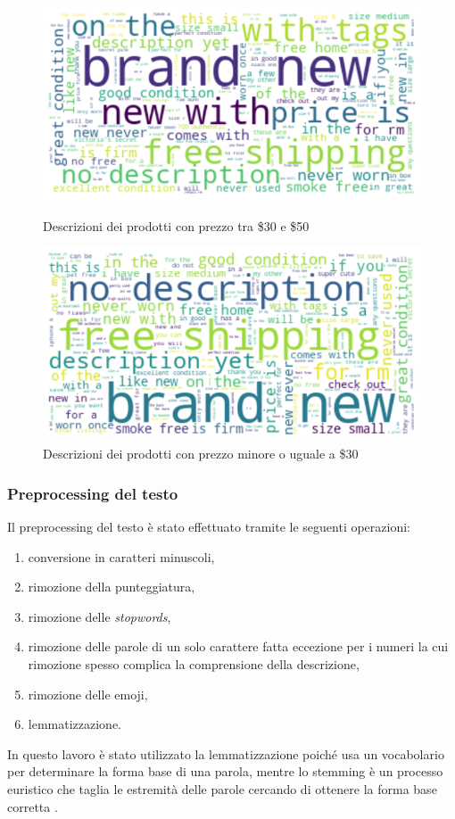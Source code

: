 \begin{figure}[H]
   \begin{minipage}{0.48\textwidth}
     \centering
     \includegraphics[width=.9\linewidth]{30_50}
	\caption{Descrizioni dei prodotti con prezzo tra \$30 e \$50}
	\label{fig:30_50}   
	\end{minipage}\hfill
   \begin{minipage}{0.48\textwidth}
     \centering
     \includegraphics[width=.9\linewidth]{minore_30}
     \caption{Descrizioni dei prodotti con prezzo minore o uguale a \$30}
     \label{Fig:minore_30}
   \end{minipage}
\end{figure}

\subsubsection{Preprocessing del testo}

Il preprocessing del testo è stato effettuato tramite le seguenti operazioni:
\begin{enumerate}
    \item conversione in caratteri minuscoli,
    \item rimozione della punteggiatura,
    \item rimozione delle \textit{stopwords},
    \item rimozione delle parole di un solo carattere fatta eccezione per i
    numeri la cui rimozione spesso complica la comprensione della descrizione,
    \item rimozione delle emoji,
    \item lemmatizzazione.
\end{enumerate}
In questo lavoro è stato utilizzato la lemmatizzazione poiché usa un vocabolario per determinare la forma base di una parola, mentre lo stemming è un processo euristico che taglia le estremità delle parole cercando di ottenere la forma base corretta \cite{balakrishnan2014stemming}. 

